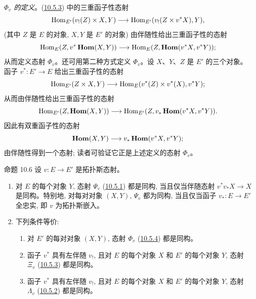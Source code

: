 \subsubsection{}
\emph{$\Phi_v$ 的定义}。(\hyperref[IV.subsubsec10.5.3]{10.5.3}) 中的三重函子性态射
$$
\operatorname{Hom}_{E'}(v_{!}(Z)\times X,Y)\longrightarrow
\operatorname{Hom}_{E'}(v_{!}(Z\times v^{\ast}X),Y){},
$$
(其中 $Z$ 是 $E$ 的对象, $X,Y$ 是 $E'$ 的对象) 由伴随性给出三重函子性的态射
$$
\operatorname{Hom}_E(Z,v^{\ast}\operatorname{\mathbf{Hom}}(X,Y))\longrightarrow
\operatorname{Hom}_E(Z,\operatorname{\mathbf{Hom}}(v^{\ast}X,v^{\ast}Y)){};
$$
从而定义态射 $\Phi_v$。还可用第二种方式定义 $\Phi_v$。设 $X$、$Y$、$Z$ 是 $E'$ 的三个对象。函子 $v^{\ast}:E'\rightarrow E$ 给出三重函子性的态射
$$
\operatorname{Hom}_{E'}(Z\times X,Y)\longrightarrow \operatorname{Hom}_E(v^{\ast}(Z)\times
v^{\ast}(X),v^{\ast}Y){};
$$
从而由伴随性给出三重函子性的态射
$$
\operatorname{Hom}_{E'}(Z,\operatorname{\mathbf{Hom}}(X,Y))\longrightarrow
\operatorname{Hom}_{E'}(Z,v_{\ast}\operatorname{\mathbf{Hom}}(v^{\ast}X,v^{\ast}Y)){}.
$$
因此\pageoriginale 有双重函子性的态射
$$
\operatorname{\mathbf{Hom}}(X,Y)\longrightarrow v_{\ast}\operatorname{\mathbf{Hom}}(v^{\ast}X,
v^{\ast}Y){};
$$
由伴随性得到一个态射; 读者可验证它正是上述定义的态射 $\Phi_v$。

\begin{enonce*}{命题 10.6}
设 $v:E\rightarrow E'$ 是拓扑斯态射。
\begin{enumerate}
\renewcommand{\labelenumi}{\theenumi)}
\item 对 $E$ 的每个对象 $Y$, 态射 $\Psi_v$ (\hyperref[IV.subsubsec10.5.1]{10.5.1}) 都是同构, 当且仅当伴随态射 $v^{\ast}v_{\ast}X\rightarrow X$ 是同构。特别地, 对每对对象 $(X,Y)$, $\Psi_v$ 都为同构, 当且仅当函子 $v_{\ast}:E\rightarrow E'$ 全忠实, 即 $v$ 为拓扑斯嵌入。

\item 下列条件等价:
\begin{enumerate}
\renewcommand{\theenumii}{\roman{enumii}}
\renewcommand{\labelenumii}{(\theenumii)}
\item 对 $E'$ 的每对对象 $(X,Y)$, 态射 $\Phi_v$ (\hyperref[IV.subsubsec10.5.4]{10.5.4}) 都是同构。

\item 函子 $v^{\ast}$ 具有左伴随 $v_{!}$, 且对 $E$ 的每个对象 $X$ 和 $E'$ 的每个对象 $Y$, 态射 $\Xi_v$ (\hyperref[IV.subsubsec10.5.3]{10.5.3}) 都是同构。

\item 函子 $v^{\ast}$ 具有左伴随 $v_{!}$, 且对 $E$ 的每个对象 $X$ 和 $E'$ 的每个对象 $Y$, 态射 $\Lambda_v$ (\hyperref[IV.subsubsec10.5.2]{10.5.2}) 都是同构。
\end{enumerate}
\end{enumerate}
\end{enonce*}

